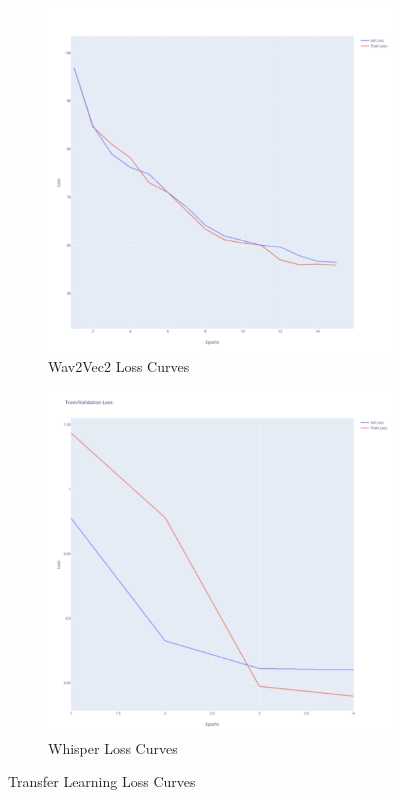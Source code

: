 \begin{figure} [H]
     \centering
     \begin{subfigure}[b]{0.49\textwidth}
         \centering
         \includegraphics[width=\textwidth]{05-research study/figures/wav2vec2graphloss.pdf}
         \caption{Wav2Vec2 Loss Curves}
         \label{fig:wav2vec2-tl-losscurves}
     \end{subfigure}
     \hfill
     \begin{subfigure}[b]{0.49\textwidth}
         \centering
         \includegraphics[width=\textwidth]{05-research study/figures/whisperfinetuneloss.pdf}
         \caption{Whisper Loss Curves}
         \label{fig:whisper-tl-losscurves}
     \end{subfigure}
     \hfill
        \caption{Transfer Learning Loss Curves}
        \label{fig:tl-losscurves}
\end{figure}

